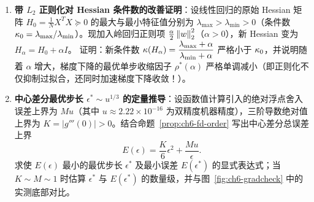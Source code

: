\begin{enumerate}[label=\textbf{6.\arabic*}, resume]
  \item \textbf{带 $L_2$ 正则化对 Hessian 条件数的改善证明}：设线性回归的原始 Hessian 矩阵 $H_0 = \frac{1}{N}X^T X \succeq 0$ 的最大与最小特征值分别为 $\lambda_{\max} > \lambda_{\min} > 0$（条件数 $\kappa_0 = \lambda_{\max}/\lambda_{\min}$）。现加入岭回归正则项 $\frac{\alpha}{2}\left\|w\right\|_2^2$（$\alpha > 0$），新 Hessian 变为 $H_\alpha = H_0 + \alpha I$。
  证明：新条件数 $\kappa(H_\alpha) = \dfrac{\lambda_{\max}+\alpha}{\lambda_{\min}+\alpha}$ 严格小于 $\kappa_0$，并说明随着 $\alpha$ 增大，梯度下降的最优单步收缩因子 $\rho^*(\alpha)$ 严格单调减小（即正则化不仅抑制过拟合，还同时加速梯度下降收敛！）。

  \item \textbf{中心差分最优步长 $\epsilon^* \sim u^{1/3}$ 的定量推导}：设函数值计算引入的绝对浮点舍入误差上界为 $M u$（其中 $u\approx 2.22\times 10^{-16}$ 为双精度机器精度），三阶导数绝对值上界为 $K = |g'''(0)| > 0$。结合命题~\ref{prop:ch6-fd-order} 写出中心差分总误差上界
  \[
    E(\epsilon) = \frac{K}{6}\epsilon^2 + \frac{M u}{\epsilon}.
  \]
  求使 $E(\epsilon)$ 最小的最优步长 $\epsilon^*$ 及最小误差 $E(\epsilon^*)$ 的显式表达式；当 $K \sim M \sim 1$ 时估算 $\epsilon^*$ 与 $E(\epsilon^*)$ 的数量级，并与图~\ref{fig:ch6-gradcheck} 中的实测底部对比。
\end{enumerate}

